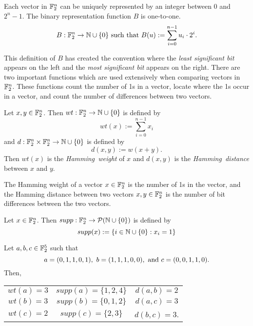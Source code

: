\par Each vector in $\mathbb{F}_2^n$ can be uniquely represented by an integer
between $0$ and $2^n-1$. The binary representation function $B$
is one-to-one.
\begin{equation}
	B:\mathbb{F}_2^n\rightarrow\mathbb{N}\cup\{0\}\ \allowbreak
  {\rm such\ that }\ \allowbreak B(u) := \sum_{i=0}^{n-1}u_i\cdot2^i.
\end{equation}

\par This definition of $B$ has created the convention where the
{\em least significant bit} appears on the left and the 
{\em most significant bit} appears on the right. There are two important
functions which are used extensively when comparing vectors in $\mathbb{F}_2^n$.
These functions count the number of 1s in a vector, locate where the 1s
occur in a vector, and count the number of differences between two vectors.

\begin{definition}
\label{def:Hamming}
	Let $x,y\in\mathbb{F}_2^n$. Then $wt:\mathbb{F}_2^n\rightarrow\mathbb{N}\cup\{0\}$
  is defined by
	\[
	  wt(x):=\sum_{i=0}^{n-1}x_i
	\]
	and $d:\mathbb{F}_2^n\times\mathbb{F}_2^n\rightarrow\mathbb{N}\cup\{0\}$ is defined by
	\[
	  d(x,y):=w(x+y).
	\]
	Then $wt(x)$ is the {\em Hamming\ weight} of $x$ and $d(x,y)$ is the
	{\em Hamming\ distance} between $x$ and $y$.
\end{definition}

\begin{remark}
	The Hamming weight of a vector $x\in\mathbb{F}_2^n$ is the number of 1s in the
  vector, and the Hamming distance between two vectors $x,y\in\mathbb{F}_2^n$ is
  the number of bit differences between the two vectors.
\end{remark}

\begin{definition}
\label{def:support}
	Let $x\in\mathbb{F}_2^n$. Then $supp:\mathbb{F}_2^n\rightarrow\allowbreak
  \mathcal{P}(\mathbb{N}\cup\{0\})$ is defined by
	\[
		supp(x):=\{i\in\mathbb{N}\cup\{0\}:x_i=1\}
	\]
\end{definition}

\begin{example}
	Let $a,b,c\in\mathbb{F}_2^5$ such that
	\[
	a=(0,1,1,0,1),\ b=(1,1,1,0,0),\ {\rm and}\ c=(0,0,1,1,0).
	\]
	Then,
	\begin{center}
		\begin{tabular}{c c c}
			$wt(a)=3$&$supp(a)=\{1,2,4\}$&$d(a,b)=2$\\
			$wt(b)=3$&$supp(b)=\{0,1,2\}$&$d(a,c)=3$\\
			$wt(c)=2$&$ supp(c)=\{2,3\}$ &$d(b,c)=3$.\\
		\end{tabular}
	\end{center}
\end{example}

